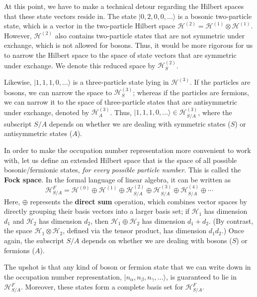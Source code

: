 \documentclass[pra,12pt]{revtex4}
\begin{document}
At this point, we have to make a technical detour regarding the
Hilbert spaces that these state vectors reside in.  The state
$|0,2,0,0,\dots\rangle$ is a bosonic two-particle state, which is a
vector in the two-particle Hilbert space $\mathscr{H}^{(2)} =
\mathscr{H}^{(1)}\otimes \mathscr{H}^{(1)}$.  However,
$\mathscr{H}^{(2)}$ also contains two-particle states that are not
symmetric under exchange, which is not allowed for bosons.  Thus, it
would be more rigorous for us to narrow the Hilbert space to the space
of state vectors that are symmetric under exchange.  We denote this
reduced space by $\mathscr{H}^{(2)}_S$.

Likewise, $|1,1,1,0,\dots\rangle$ is a three-particle state lying in
$\mathscr{H}^{(3)}$.  If the particles are bosons, we can narrow the
space to $\mathscr{H}^{(3)}_S$; whereas if the particles are fermions,
we can narrow it to the space of three-particle states that are
antisymmetric under exchange, denoted by $\mathscr{H}^{(3)}_A$.  Thus,
$|1,1,1,0,\dots\rangle \in \mathscr{H}^{(3)}_{S/A}$, where the
subscript $S/A$ depends on whether we are dealing with symmetric
states ($S$) or antisymmetric states ($A$).


In order to make the occupation number representation more convenient
to work with, let us define an extended Hilbert space that is the
space of all possible bosonic/fermionic states, \textit{for every
  possible particle number}.  This is called the \textbf{Fock space}.
In the formal language of linear algebra, it can be written as
$$\mathscr{H}_{S/A}^F = \mathscr{H}^{(0)} \oplus \mathscr{H}^{(1)} \oplus \mathscr{H}^{(2)}_{S/A} \oplus \mathscr{H}^{(3)}_{S/A} \oplus \mathscr{H}^{(4)}_{S/A} \oplus \cdots$$
Here, $\oplus$ represents the \textbf{direct sum} operation, which
combines vector spaces by directly grouping their basis vectors into a
larger basis set; if $\mathscr{H}_1$ has dimension $d_1$ and
$\mathscr{H}_2$ has dimension $d_2$, then
$\mathscr{H}_1\oplus\mathscr{H}_2$ has dimension $d_1+d_2$.  (By
contrast, the space $\mathscr{H}_1\otimes\mathscr{H}_2$, defined via
the tensor product, has dimension $d_1d_2$.)  Once again, the
subscript $S/A$ depends on whether we are dealing with bosons ($S$) or
fermions ($A$).

The upshot is that any kind of boson or fermion state that we can
write down in the occupation number representation,
$|n_\alpha,n_\beta,n_\gamma,\dots\rangle$, is guaranteed to lie in
$\mathscr{H}^{F}_{S/A}$.  Moreover, these states form a complete basis
set for $\mathscr{H}^{F}_{S/A}$.
\end{document}
